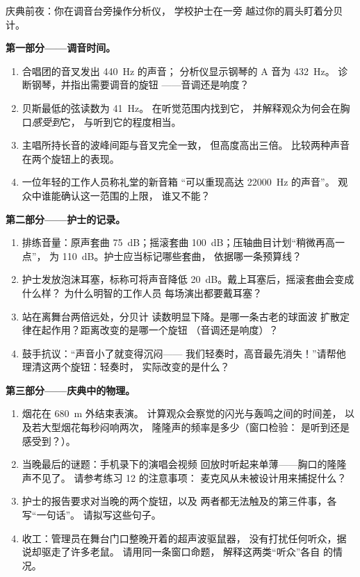 \begin{problem}\label{pb:g8:sound-pitch-loudness:1}
庆典前夜：你在调音台旁操作分析仪，
学校护士在一旁
越过你的肩头盯着分贝计。

\medskip\noindent\textbf{第一部分——调音时间。}
\begin{enumerate}
  \item 合唱团的音叉发出 \qty{440}{Hz} 的声音；
        分析仪显示钢琴的 A 音为 \qty{432}{Hz}。
        诊断钢琴，并指出需要调音的旋钮
        ——音调还是响度？
  \item 贝斯最低的弦读数为 \qty{41}{Hz}。
        在听觉范围内找到它，
        并解释观众为何会在胸口\emph{感受到}它，
        与听到它的程度相当。
  \item 主唱所持长音的波峰间距与音叉完全一致，
        但高度高出三倍。
        比较两种声音在两个旋钮上的表现。
  \item 一位年轻的工作人员称礼堂的新音箱
        “可以重现高达 \qty{22000}{Hz} 的声音”。
        观众中谁能确认这一范围的上限，
        谁又不能？
\end{enumerate}

\medskip\noindent\textbf{第二部分——护士的记录。}
\begin{enumerate}[resume]
  \item 排练音量：原声套曲 \qty{75}{dB}；摇滚套曲
        \qty{100}{dB}；压轴曲目计划“稍微再高一点”，
        为 \qty{110}{dB}。护士应当标记哪些套曲，
        依据哪一条预算线？
  \item 护士发放泡沫耳塞，标称可将声音降低
        \qty{20}{dB}。戴上耳塞后，摇滚套曲会变成什么样？
        为什么明智的工作人员
        每场演出都要戴耳塞？
  \item 站在离舞台两倍远处，分贝计
        读数明显下降。是哪一条古老的球面波
        扩散定律在起作用？距离改变的是哪一个旋钮
        （音调还是响度）？
  \item 鼓手抗议：“声音小了就变得沉闷——
        我们轻奏时，高音最先消失！”请帮他
        理清这两个旋钮：轻奏时，
        实际改变的是什么？
\end{enumerate}

\medskip\noindent\textbf{第三部分——庆典中的物理。}
\begin{enumerate}[resume]
  \item 烟花在 \qty{680}{m} 外结束表演。
        计算观众会察觉的闪光与轰鸣之间的时间差，
        以及若大型烟花每秒闷响两次，
        隆隆声的频率是多少（窗口检验：
        是听到还是感受到？）。
  \item 当晚最后的谜题：手机录下的演唱会视频
        回放时听起来单薄——胸口的隆隆声不见了。
        请参考练习 12 的注意事项：
        麦克风从未被设计用来捕捉什么？
  \item 护士的报告要求对当晚的两个旋钮，以及
        两者都无法触及的第三件事，各写“一句话”。
        请拟写这些句子。
  \item 收工：管理员在舞台门口整晚开着的超声波驱鼠器，
        没有打扰任何听众，据说却驱走了许多老鼠。
        请用同一条窗口命题，
        解释这两类“听众”各自
        的情况。
\end{enumerate}
\end{problem}
